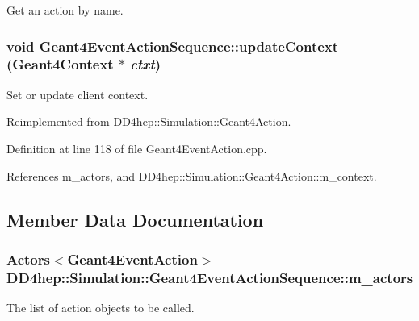 Get an action by name. \hypertarget{class_d_d4hep_1_1_simulation_1_1_geant4_event_action_sequence_a26291513e94aec2a01464d0121532999}{
\subsubsection[{updateContext}]{\setlength{\rightskip}{0pt plus 5cm}void Geant4EventActionSequence::updateContext ({\bf Geant4Context} $\ast$ {\em ctxt})}}
\label{class_d_d4hep_1_1_simulation_1_1_geant4_event_action_sequence_a26291513e94aec2a01464d0121532999}


Set or update client context. 

Reimplemented from \hyperlink{class_d_d4hep_1_1_simulation_1_1_geant4_action_ae3b9daf2af881df956c46568c0743313}{DD4hep::Simulation::Geant4Action}.

Definition at line 118 of file Geant4EventAction.cpp.

References m\_\-actors, and DD4hep::Simulation::Geant4Action::m\_\-context.

\subsection{Member Data Documentation}
\hypertarget{class_d_d4hep_1_1_simulation_1_1_geant4_event_action_sequence_a6b3b349d21a34103e1e070a6488bb0e5}{
\subsubsection[{m\_\-actors}]{\setlength{\rightskip}{0pt plus 5cm}Actors$<${\bf Geant4EventAction}$>$ {\bf DD4hep::Simulation::Geant4EventActionSequence::m\_\-actors}}}
\label{class_d_d4hep_1_1_simulation_1_1_geant4_event_action_sequence_a6b3b349d21a34103e1e070a6488bb0e5}


The list of action objects to be called. 

